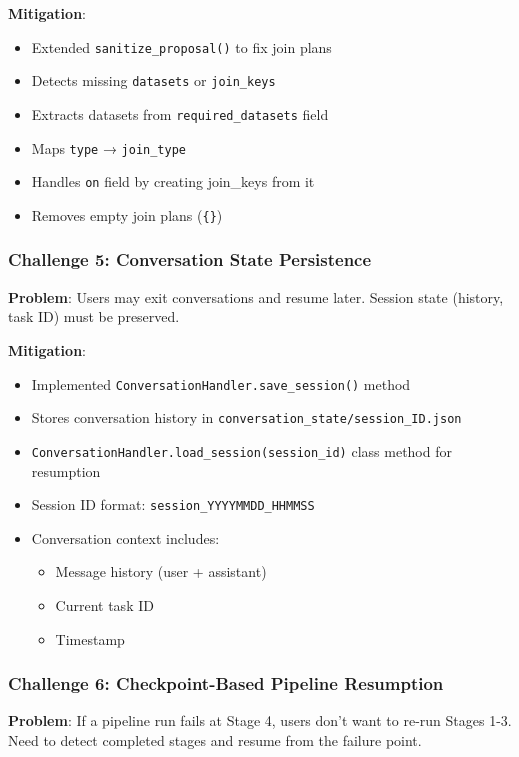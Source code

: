 \documentclass[11pt,a4paper]{article}
\begin{document}
\textbf{Mitigation}:
\begin{itemize}
    \item Extended \texttt{sanitize\_proposal()} to fix join plans
    \item Detects missing \texttt{datasets} or \texttt{join\_keys}
    \item Extracts datasets from \texttt{required\_datasets} field
    \item Maps \texttt{type} → \texttt{join\_type}
    \item Handles \texttt{on} field by creating join\_keys from it
    \item Removes empty join plans (\texttt{\{\}})
\end{itemize}

\subsubsection{Challenge 5: Conversation State Persistence}

\textbf{Problem}: Users may exit conversations and resume later. Session state (history, task ID) must be preserved.

\textbf{Mitigation}:
\begin{itemize}
    \item Implemented \texttt{ConversationHandler.save\_session()} method
    \item Stores conversation history in \texttt{conversation\_state/session\_ID.json}
    \item \texttt{ConversationHandler.load\_session(session\_id)} class method for resumption
    \item Session ID format: \texttt{session\_YYYYMMDD\_HHMMSS}
    \item Conversation context includes:
    \begin{itemize}
        \item Message history (user + assistant)
        \item Current task ID
        \item Timestamp
    \end{itemize}
\end{itemize}

\subsubsection{Challenge 6: Checkpoint-Based Pipeline Resumption}

\textbf{Problem}: If a pipeline run fails at Stage 4, users don't want to re-run Stages 1-3. Need to detect completed stages and resume from the failure point.
\end{document}
